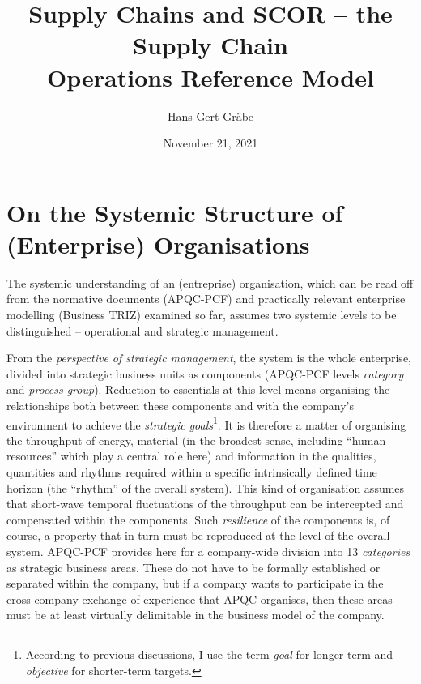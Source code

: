 \documentclass[11pt,a4paper]{article}
\title{Supply Chains and SCOR -- the Supply Chain\\ Operations Reference
  Model}
\author{Hans-Gert Gr\"abe}
\date{November 21, 2021}
\begin{document}
\maketitle

\section{On the Systemic Structure of (Enterprise) Organisations}

The systemic understanding of an (entreprise) organisation, which can be read
off from the normative documents (APQC-PCF) and practically relevant
enterprise modelling (Business TRIZ) examined so far, assumes two systemic
levels to be distinguished -- operational and strategic management.

From the \emph{perspective of strategic management}, the system is the whole
enterprise, divided into strategic business units as components (APQC-PCF
levels \emph{category} and \emph{process group}). Reduction to essentials at
this level means organising the relationships both between these components
and with the company's environment to achieve the \emph{strategic
  goals}\footnote{According to previous discussions, I use the term
  \emph{goal} for longer-term and \emph{objective} for shorter-term targets.}.
It is therefore a matter of organising the throughput of energy, material (in
the broadest sense, including \enquote{human resources} which play a central
role here) and information in the qualities, quantities and rhythms required
within a specific intrinsically defined time horizon (the \enquote{rhythm} of
the overall system). This kind of organisation assumes that short-wave
temporal fluctuations of the throughput can be intercepted and compensated
within the components. Such \emph{resilience} of the components is, of course,
a property that in turn must be reproduced at the level of the overall
system. APQC-PCF provides here for a company-wide division into 13
\emph{categories} as strategic business areas. These do not have to be
formally established or separated within the company, but if a company wants
to participate in the cross-company exchange of experience that APQC
organises, then these areas must be at least virtually delimitable in the
business model of the company.
\end{document}
